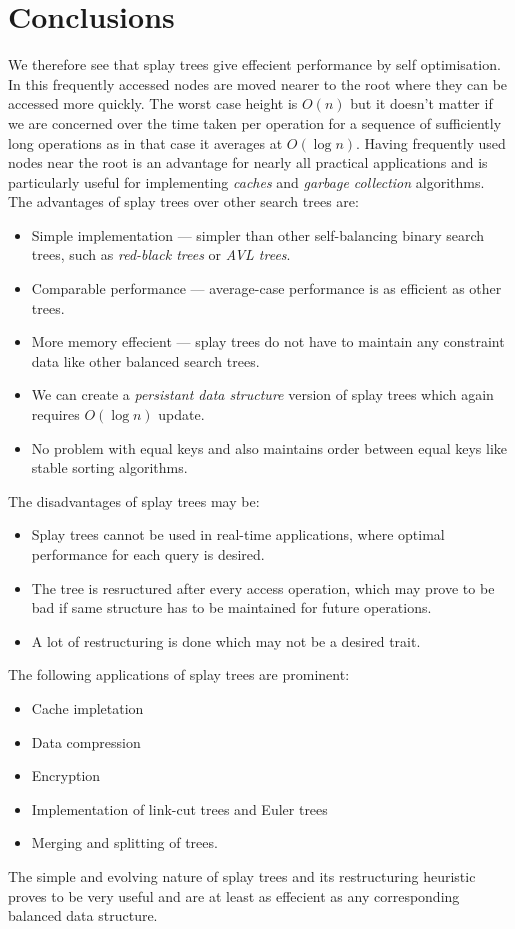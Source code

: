 \documentclass{article}
\begin{document}
\section{Conclusions}
We therefore see that splay trees give effecient performance by self optimisation. In this frequently accessed nodes are moved nearer to the root where they can be accessed more quickly. The worst case height is $O(n)$ but it doesn't matter if we are concerned over the time taken per operation for a sequence of sufficiently long operations as in that case it averages at $O(\log n)$.  Having frequently used nodes near the root is an advantage for nearly all practical applications and is particularly useful for implementing \emph{caches} and \emph{garbage collection} algorithms.
The advantages of splay trees over other search trees are:
\begin{itemize}
\item Simple implementation — simpler than other self-balancing binary search trees, such as \emph{red-black trees} or \emph{AVL trees}.
\item Comparable performance — average-case performance is as efficient as other trees.
\item More memory effecient — splay trees do not have to maintain any constraint data like other balanced search trees.
\item We can create a \emph{persistant data structure} version of splay trees which again requires $O(\log n)$ update.
\item No problem with equal keys and also maintains order between equal keys like stable sorting algorithms.
\end{itemize}
The disadvantages of splay trees may be:
\begin{itemize}
\item Splay trees cannot be used in real-time applications, where optimal performance for each query is desired.
\item The tree is resructured after every access operation, which may prove to be bad if same structure has to be maintained for future operations.
\item A lot of restructuring is done which may not be a desired trait.
\end{itemize}
The following applications of splay trees are prominent:
\begin{itemize}
\item Cache impletation
\item Data compression
\item Encryption
\item Implementation of link-cut trees and Euler trees
\item Merging and splitting of trees.
\end{itemize}
The simple and evolving nature of splay trees and its restructuring heuristic proves to be very useful and are at least as effecient as any corresponding balanced data structure.

\end{document}
